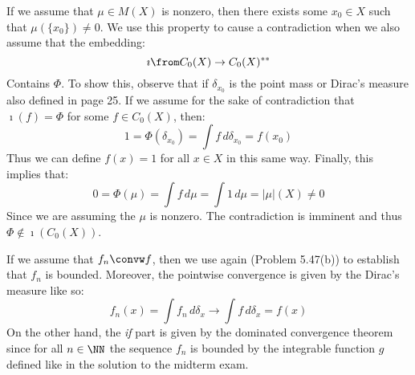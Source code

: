If we assume that $\mu\in M(X)$ is nonzero, then there exists some $x_0\in X$ such that $\mu(\{x_0\})\neq 0$. We use this property to cause a contradiction when we also assume that the embedding:
$$\imath \from C_0(X) \to C_0(X)^{**}$$ 
Contains $\Phi$.  To show this, observe that  if $\delta_{x_0}$ is the point mass or Dirac's measure also defined in page 25. If we assume for the sake of contradiction that $\imath(f)= \Phi$ for some $f\in C_0(X)$, then:
$$1=\Phi(\delta_{x_0}) = \int f \, d\delta_{x_0} = f(x_0) $$
Thus we can define $f(x) =1$ for all $x\in X$ in this same way. Finally, this implies that:
$$0=\Phi(\mu)= \int f \, d\mu = \int 1\, d\mu = |\mu|(X) \neq 0$$
Since we are assuming the $\mu$ is nonzero. The contradiction is imminent and thus $\Phi\notin \imath(C_0(X))$.

If we assume that $f_n \convw f$, then we use again (Problem 5.47(b)) to establish that $f_n$ is bounded. Moreover, the pointwise convergence is given by the Dirac's measure like so:
$$f_n(x) = \int f_n \, d\delta_x \to \int f\, d\delta_x= f(x)$$
On the other hand, the \textit{if} part is given by the dominated convergence theorem since for all $n\in \NN$ the sequence $f_n$ is bounded by the integrable function $g$ defined like in the solution to the midterm exam. 

